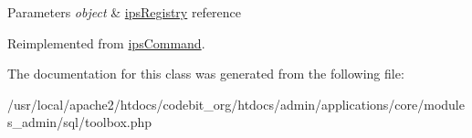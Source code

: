 \begin{DoxyParams}{Parameters}
{\em object} & \hyperlink{classips_registry}{ips\-Registry} reference \\
\hline
\end{DoxyParams}


Reimplemented from \hyperlink{classips_command_afbc4e912a0604b94d47d66744c64d8ba}{ips\-Command}.



The documentation for this class was generated from the following file\-:\begin{DoxyCompactItemize}
\item 
/usr/local/apache2/htdocs/codebit\-\_\-org/htdocs/admin/applications/core/modules\-\_\-admin/sql/toolbox.\-php\end{DoxyCompactItemize}
